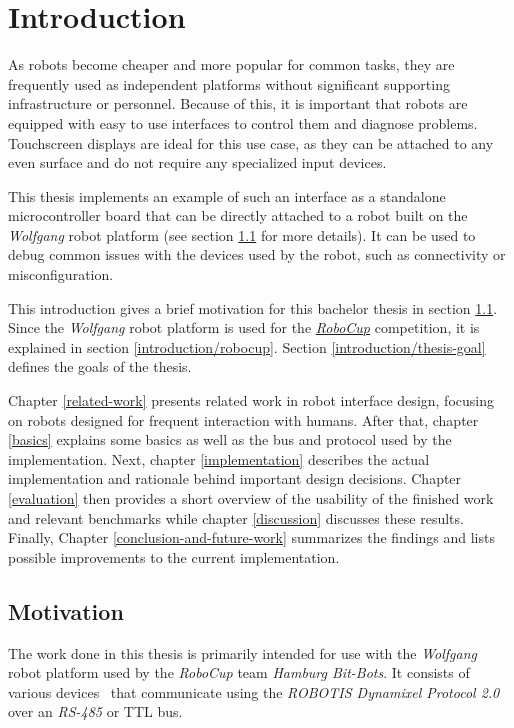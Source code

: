 \chapter{Introduction}
\label{introduction}

As robots become cheaper and more popular for common tasks, they are frequently used as independent
platforms without significant supporting infrastructure or personnel. Because of this, it is
important that robots are equipped with easy to use interfaces to control them and diagnose problems.
Touchscreen displays are ideal for this use case, as they can be attached to any even surface and do
not require any specialized input devices.

This thesis implements an example of such an interface as a standalone microcontroller board
that can be directly attached to a robot built on the \textit{Wolfgang} robot platform (see section
\ref{introduction/motivation} for more details). It can be used to debug common issues with the devices
used by the robot, such as connectivity or misconfiguration.

This introduction gives a brief motivation for this bachelor thesis in section \ref{introduction/motivation}.
Since the \textit{Wolfgang} robot platform is used for the \href{https://www.robocup.org/}{\textit{RoboCup}}
competition, it is explained in section \ref{introduction/robocup}. Section \ref{introduction/thesis-goal}
defines the goals of the thesis.

Chapter \ref{related-work} presents related work in robot interface design, focusing on robots
designed for frequent interaction with humans. After that, chapter \ref{basics} explains some basics
as well as the bus and protocol used by the implementation. Next, chapter \ref{implementation}
describes the actual implementation and rationale behind important design decisions. Chapter \ref{evaluation}
then provides a short overview of the usability of the finished work and relevant benchmarks while
chapter \ref{discussion} discusses these results. Finally, Chapter \ref{conclusion-and-future-work}
summarizes the findings and lists possible improvements to the current implementation.

\section{Motivation}
\label{introduction/motivation}

The work done in this thesis is primarily intended for use with the \textit{Wolfgang} robot platform
used by the \textit{RoboCup} team \textit{Hamburg Bit-Bots}. It consists of various devices~\cite{bit-bots-specs}
that communicate using the \textit{ROBOTIS Dynamixel Protocol 2.0}~\cite{dynamixel-protocol-2} over
an \textit{RS-485} or TTL bus.

